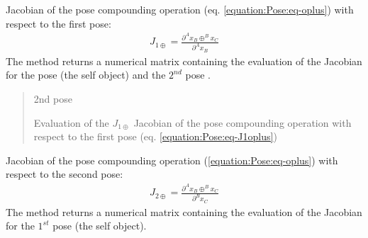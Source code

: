 \documentclass[letterpaper,10pt,english]{sphinxmanual}
\begin{document}
\begin{fulllineitems}
\begin{fulllineitems}
\label{\detokenize{Pose:Pose.Pose.J_1oplus}}
\pysigstartsignatures
{}
\pysigstopsignatures
\sphinxAtStartPar
Jacobian of the pose compounding operation (eq. \eqref{equation:Pose:eq-oplus}) with respect to the first pose:
\begin{equation}\label{equation:Pose:eq-J1oplus}
\begin{split}J_{1\oplus}=\frac{\partial  ^Ax_B \oplus ^Bx_C}{\partial ^Ax_B}\end{split}
\end{equation}
\sphinxAtStartPar
The method returns a numerical matrix containing the evaluation of the Jacobian for the pose  (the self object) and the \(2^{nd}\) pose .

\sphinxAtStartPar
{}
\begin{quote}\begin{description}
\sphinxAtStartPar
{} \textendash{} 2nd pose

\sphinxAtStartPar
Evaluation of the \(J_{1\oplus}\) Jacobian of the pose compounding operation with respect to the first pose (eq. \eqref{equation:Pose:eq-J1oplus})

\end{description}\end{quote}

\end{fulllineitems}


\begin{fulllineitems}
\label{\detokenize{Pose:Pose.Pose.J_2oplus}}
\pysigstartsignatures
{}
\pysigstopsignatures
\sphinxAtStartPar
Jacobian of the pose compounding operation (\eqref{equation:Pose:eq-oplus}) with respect to the second pose:
\begin{equation}\label{equation:Pose:eq-J2oplus}
\begin{split}J_{2\oplus}=\frac{\partial  ^Ax_B \oplus ^Bx_C}{\partial ^Bx_C}\end{split}
\end{equation}
\sphinxAtStartPar
The method returns a numerical matrix containing the evaluation of the Jacobian for the \(1^{st}\) pose  (the self object).


\end{fulllineitems}
\end{fulllineitems}
\end{document}
